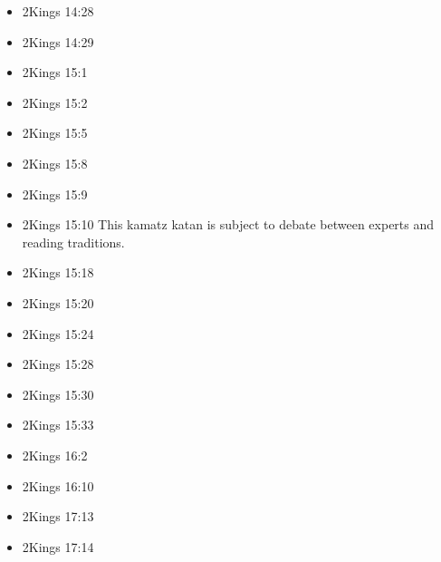 \documentclass[14pt]{book}
\begin{document}
\begin{multicols}{2}
\begin{itemize}
													\item 2Kings 14:28
													
													\item 2Kings 14:29
													
													\item 2Kings 15:1
													
													\item 2Kings 15:2
													
													\item 2Kings 15:5
													
													\item 2Kings 15:8
													
													\item 2Kings 15:9
													
													\item 2Kings 15:10 This kamatz katan is subject to debate between experts and reading traditions.
													
													\item 2Kings 15:18
													
													\item 2Kings 15:20
													
													\item 2Kings 15:24
													
													\item 2Kings 15:28
													
													\item 2Kings 15:30
													
													\item 2Kings 15:33
													
													\item 2Kings 16:2
													
													\item 2Kings 16:10
													
													\item 2Kings 17:13
													
													\item 2Kings 17:14
													

\end{itemize}
\end{multicols}
\end{document}
